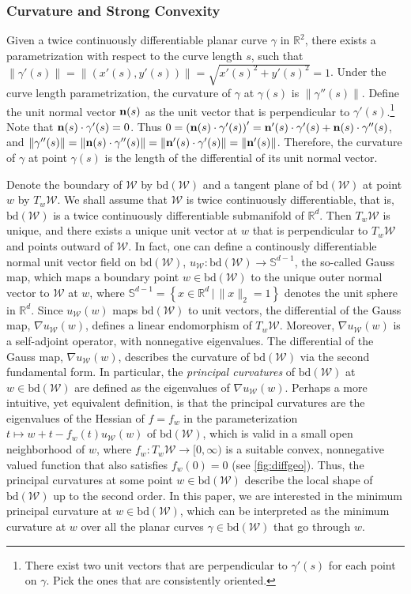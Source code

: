 \documentclass[english]{article}
\newcommand{\todoa}[2][]{\todo[color=Purple!20,size=\tiny,#1]{A: #2}}
\newcommand{\cW}{\mathcal{W}}
\newcommand{\real}{\mathbb{R}}
\newcommand{\R}{\mathbb{R}}
\newcommand{\bS}{\mathbb{S}}
\newcommand{\set}[2]{\left\{#1 \,\vert\, #2 \right\}}
\newcommand{\bd}{\mathrm{bd}}
\begin{document}
\subsubsection{Curvature and Strong Convexity}
\label{sec:curvature_intro}
Given a twice continuously differentiable planar curve $\gamma$ in $\real^2$, there exists a parametrization with respect to the curve length $s$, such that $\|\gamma'(s)\| = \|\left(x'(s), y'(s)\right)\| = \sqrt{x'(s)^2 + y'(s)^2}=1$. Under the curve length parametrization, the curvature of $\gamma$ at $\gamma(s)$ is $\|\gamma''(s)\|$.
Define the unit normal vector ${\bf n}(s)$ as the unit vector that is perpendicular to $\gamma'(s)$.\footnote{There exist two unit vectors that are perpendicular to $\gamma'(s)$ for each point on $\gamma$. Pick the ones that are consistently oriented.}
Note that ${\bf n}(s)\cdot \gamma'(s) = 0$. Thus $0=\left({\bf n}(s)\cdot \gamma'(s)\right)' = {\bf n}'(s)\cdot\gamma'(s) + {\bf n}(s)\cdot \gamma''(s)$, and $\|\gamma''(s)\| = \|{\bf n}(s)\cdot \gamma''(s)\| = \|{\bf n}'(s)\cdot\gamma'(s)\| = \|{\bf n}'(s)\|$. Therefore, the curvature of $\gamma$ at point $\gamma(s)$ is the length of the differential of its unit normal vector.
 
Denote the boundary of $\cW$ by $\bd(\cW)$ and a tangent plane of $\bd(\cW)$ at point $w$ by $T_w\cW$.
We shall assume that $\cW$ is twice continuously differentiable, that is, $\bd(\cW)$ is a twice continuously differentiable submanifold of $\R^d$. Then $T_w\cW$ is unique,
and there exists a unique unit vector at $w$ that is perpendicular to $T_w\cW$ and points outward of $\cW$.
In fact, one can define a continously differentiable normal unit vector field on $\bd(\cW)$, $u_{\cW}: \bd(\cW) \to \bS^{d-1}$, the so-called Gauss map, which maps a boundary point $w\in \bd(\cW)$ to the unique outer normal vector to $\cW$ at $w$, where
$\bS^{d-1}=\set{x\in\R^d}{\|x\|_2=1}$ denotes the unit sphere in $\R^d$.
Since $u_{\cW}(w)$ maps $\bd(\cW)$ to unit vectors, the differential of the Gauss map, $\nabla u_{\cW}(w)$, defines a linear endomorphism of $T_w\cW$. Moreover, $\nabla u_{\cW}(w)$ is a self-adjoint operator, with nonnegative eigenvalues.
The differential of the Gauss map, $\nabla u_{\cW}(w)$, describes the curvature of $\bd(\cW)$ via the second fundamental form. In particular, the \emph{principal curvatures} of $\bd(\cW)$ at $w\in\bd(\cW)$ are defined as the eigenvalues of $\nabla u_{\cW}(w)$.   
Perhaps a more intuitive, yet equivalent definition, is that the principal curvatures are the eigenvalues
of the Hessian of $f=f_w$ in the parameterization $t\mapsto w+t-f_w(t) u_{\cW}(w)$ of $\bd(\cW)$,
which is valid in a small open neighborhood of $w$, where $f_w: T_w \cW \to [0,\infty)$ is
a suitable convex, nonnegative valued function that also satisfies $f_w(0)= 0$ (see \cref{fig:diffgeo}\todoa{Move the two figures further}).
Thus, the principal curvatures at some point $w\in \bd(\cW)$ describe the local shape of $\bd(\cW)$ 
up to the second order. 
In this paper, we are interested in the minimum principal curvature at $w\in\bd(\cW)$, which can be interpreted as the minimum curvature at $w$ over all the planar curves $\gamma \in \bd(\cW)$ that go through $w$. 
\end{document}
